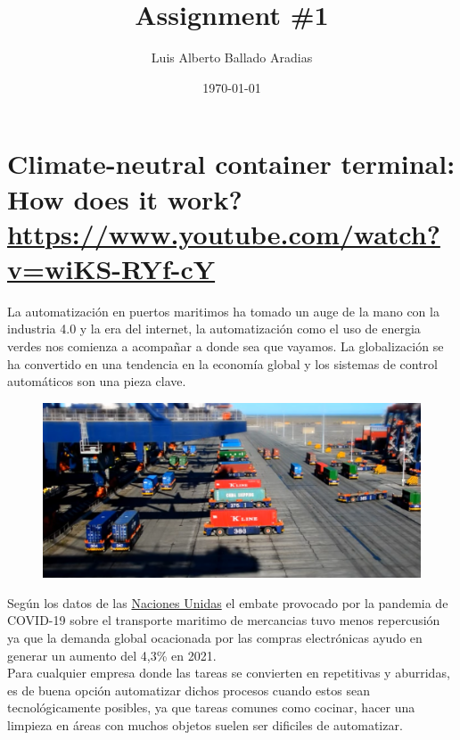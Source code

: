 \documentclass[
	12pt, %
]{fphw}
\title{Assignment \#1} %
\author{Luis Alberto Ballado Aradias} %
\date{\today} %
\institute{Centro de Investigación y de Estudios Avanzados del IPN \\ Unidad Tamaulipas} %
\begin{document}
\maketitle %

\section*{{\color{Apricot}Climate-neutral container terminal: How does it work?} \url{https://www.youtube.com/watch?v=wiKS-RYf-cY}}

La automatización en puertos maritimos ha tomado un auge de la mano con la industria 4.0 y la era del internet, la automatización como el uso de energia verdes nos comienza a acompañar a donde sea que vayamos. La globalización se ha convertido en una tendencia en la economía global y los sistemas de control automáticos son una pieza clave.\\

\begin{figure}[H]
  \centering
  \includegraphics[scale=0.4]{images/agv.png}
\end{figure}

Según los datos de las \href{https://news.un.org/es/story/2021/11/1500122}{Naciones Unidas} el embate provocado por la pandemia de COVID-19 sobre el transporte maritimo de mercancias tuvo menos repercusión ya que la demanda global ocacionada por las compras electrónicas ayudo en generar un aumento del 4,3\% en 2021. \\

Para cualquier empresa donde las tareas se convierten en repetitivas y aburridas, es de buena opción automatizar dichos procesos cuando estos sean tecnológicamente posibles, ya que tareas comunes como cocinar, hacer una limpieza en áreas con muchos objetos suelen ser dificiles de automatizar.\\
\end{document}
